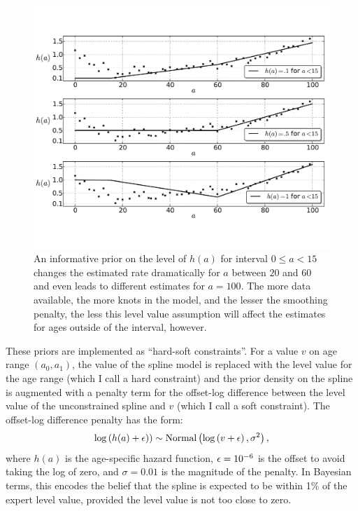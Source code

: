 \begin{figure}[h]
\begin{center}
\includegraphics[width=\textwidth]{level_value-smoothing-splines.pdf}
\caption{An informative prior on the level of $h(a)$ for interval $0 \leq a <
  15$ changes the estimated rate dramatically for $a$ between $20$ and
  $60$ and even leads to different estimates for $a = 100$.  The more
  data available, the more knots in the model, and the lesser the
  smoothing penalty, the less this level value assumption will affect
  the estimates for ages outside of the interval, however.  }
\label{level-value-priors}
\end{center}
\end{figure}



These priors are implemented as ``hard-soft constraints''.  For a
value $v$ on age range $(a_0,a_1)$, the value of the spline model is
replaced with the level value for the age range (which I call a hard
constraint) and the prior density on the spline is augmented with a
penalty term for the offset-log difference between the level value of
the unconstrained spline and $v$ (which I call a soft constraint). The
offset-log difference penalty has the form:
\[
\log\left(h(a)+\epsilon)\right) \sim
 \operatorname{Normal}\left(\log\left(v + \epsilon\right), \sigma^2\right),
\]
where $h(a)$ is the age-specific hazard function, $\epsilon = 10^{-6}$ is the
offset to avoid taking the log of zero, and $\sigma = 0.01$ is the
magnitude of the penalty.  In Bayesian terms, this encodes the belief
that the spline is expected to be within 1\% of the expert level
value, provided the level value is not too close to zero.

